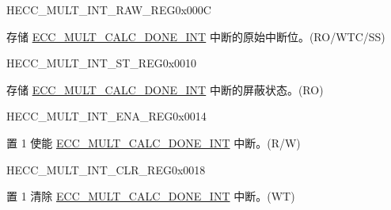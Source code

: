 \begin{register}{H}{ECC\_MULT\_INT\_RAW\_REG}{0x000C}\label{regdesc:ECCMULTINTRAWREG}
%
%
\regnewline%
\begin{regdesc}\begin{reglist}
\label{fielddesc:ECCMULTCALCDONEINTRAW}\item [ECC\_MULT\_CALC\_DONE\_INT\_RAW] 存储 \hyperref[int:ECCMULTCALCDONEINT]{ECC\_MULT\_CALC\_DONE\_INT} 中断的原始中断位。(RO/WTC/SS)
\end{reglist}\end{regdesc}
\end{register}


\begin{register}{H}{ECC\_MULT\_INT\_ST\_REG}{0x0010}\label{regdesc:ECCMULTINTSTREG}
%
%
\regnewline%
\begin{regdesc}\begin{reglist}
\label{fielddesc:ECCMULTCALCDONEINTST}\item [ECC\_MULT\_CALC\_DONE\_INT\_ST] 存储 \hyperref[int:ECCMULTCALCDONEINT]{ECC\_MULT\_CALC\_DONE\_INT} 中断的屏蔽状态。(RO)
\end{reglist}\end{regdesc}
\end{register}


\begin{register}{H}{ECC\_MULT\_INT\_ENA\_REG}{0x0014}\label{regdesc:ECCMULTINTENAREG}
%
%
\regnewline%
\begin{regdesc}\begin{reglist}
\label{fielddesc:ECCMULTCALCDONEINTENA}\item [ECC\_MULT\_CALC\_DONE\_INT\_ENA] 置 1 使能 \hyperref[int:ECCMULTCALCDONEINT]{ECC\_MULT\_CALC\_DONE\_INT} 中断。(R/W)
\end{reglist}\end{regdesc}
\end{register}


\begin{register}{H}{ECC\_MULT\_INT\_CLR\_REG}{0x0018}\label{regdesc:ECCMULTINTCLRREG}
%
%
\regnewline%
\begin{regdesc}\begin{reglist}
\label{fielddesc:ECCMULTCALCDONEINTCLR}\item [ECC\_MULT\_CALC\_DONE\_INT\_CLR] 置 1 清除 \hyperref[int:ECCMULTCALCDONEINT]{ECC\_MULT\_CALC\_DONE\_INT} 中断。(WT)
\end{reglist}\end{regdesc}
\end{register}


